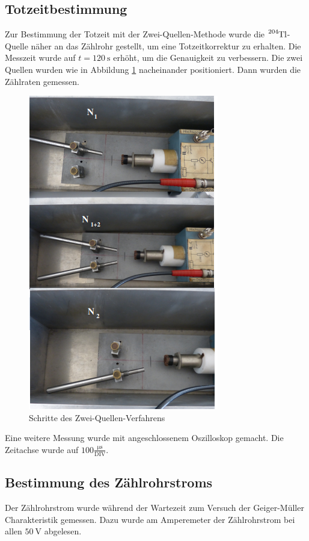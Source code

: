 \subsection{Totzeitbestimmung}
Zur Bestimmung der Totzeit mit der Zwei-Quellen-Methode wurde die $\ce{^{204}Tl}$-Quelle näher an das Zählrohr gestellt, um eine Totzeitkorrektur zu erhalten.
Die Messzeit wurde auf $t=\SI{120}{\second}$ erhöht, um die Genauigkeit zu verbessern.
Die zwei Quellen wurden wie in Abbildung \ref{fig:zqm} nacheinander positioniert. Dann wurden die Zählraten gemessen.
\begin{figure}
  \centering
  \includegraphics[scale=0.6]{pics/zqmethode.png}
  \caption{Schritte des Zwei-Quellen-Verfahrens}
  \label{fig:zqm}
\end{figure}
Eine weitere Messung wurde mit angeschlossenem Oszilloskop gemacht. Die Zeitachse wurde auf $100 \frac{\si{\micro \second}}{\text{DIV}}$.
\subsection{Bestimmung des Zählrohrstroms}
Der Zählrohrstrom wurde während der Wartezeit zum Versuch der Geiger-Müller Charakteristik gemessen.
Dazu wurde am Amperemeter der Zählrohrstrom bei allen $\SI{50}{\volt}$ abgelesen. 